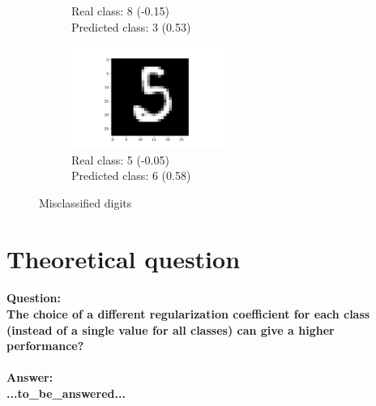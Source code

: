\documentclass[a4paper]{article}    %
\begin{document}
\begin{figure}[H]
\begin{subfigure}{0.32\textwidth}
        \caption{
            Real class: 8 (-0.15)\\
            Predicted class: 3 (0.53)}
        \label{fig:example_11}
    \end{subfigure}
    \hfill
    \begin{subfigure}{0.32\textwidth}
        \centering
        \includegraphics[width=5.0cm]{20}
        \caption{
            Real class: 5 (-0.05)\\
            Predicted class: 6 (0.58)}
        \label{fig:example_12}
    \end{subfigure}
    \hfill
    \caption{Misclassified digits} 
    \label{fig:misclassified_digits}
\end{figure}

\newpage
\section{Theoretical question}

\paragraph{\textbf{Question:}\\
The choice of a different regularization coefficient for each class (instead of a single value for all classes) can give a higher performance?}

\paragraph{\textbf{Answer:}\\
...to\_be\_answered...}

\end{document}
